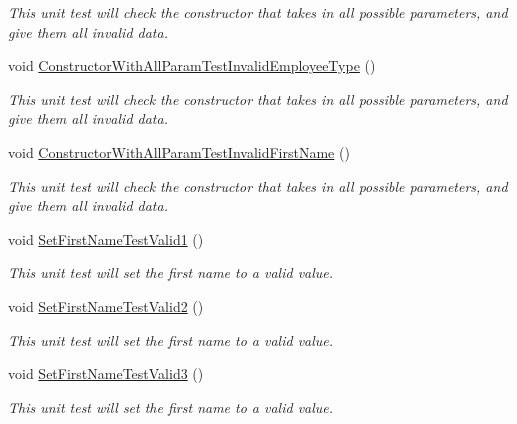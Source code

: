 \begin{DoxyCompactItemize}
\begin{DoxyCompactList}\small\item\em This unit test will check the constructor that takes in all possible parameters, and give them all invalid data. \end{DoxyCompactList}\item 
void \hyperlink{class_my_all_employee_1_1_tests_1_1_employee_tests_ae23b307e9a25395d912d35dfd528a425}{Constructor\+With\+All\+Param\+Test\+Invalid\+Employee\+Type} ()
\begin{DoxyCompactList}\small\item\em This unit test will check the constructor that takes in all possible parameters, and give them all invalid data. \end{DoxyCompactList}\item 
void \hyperlink{class_my_all_employee_1_1_tests_1_1_employee_tests_ad1b7c619af913a7432cd0fee38780e79}{Constructor\+With\+All\+Param\+Test\+Invalid\+First\+Name} ()
\begin{DoxyCompactList}\small\item\em This unit test will check the constructor that takes in all possible parameters, and give them all invalid data. \end{DoxyCompactList}\item 
void \hyperlink{class_my_all_employee_1_1_tests_1_1_employee_tests_a3bfac4379a4a632f9e7dd2a5069e3f6b}{Set\+First\+Name\+Test\+Valid1} ()
\begin{DoxyCompactList}\small\item\em This unit test will set the first name to a valid value. \end{DoxyCompactList}\item 
void \hyperlink{class_my_all_employee_1_1_tests_1_1_employee_tests_a435bffb5dabc53bf457a5af13ad0bef4}{Set\+First\+Name\+Test\+Valid2} ()
\begin{DoxyCompactList}\small\item\em This unit test will set the first name to a valid value. \end{DoxyCompactList}\item 
void \hyperlink{class_my_all_employee_1_1_tests_1_1_employee_tests_afb579cc0ea6380dceddc7935bd5a058d}{Set\+First\+Name\+Test\+Valid3} ()
\begin{DoxyCompactList}\small\item\em This unit test will set the first name to a valid value. \end{DoxyCompactList}\item 

\end{DoxyCompactItemize}
